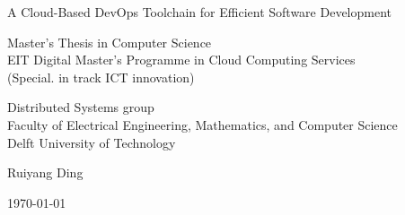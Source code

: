 \begin{titlepage}

  \begin{center}
  \null\vfill
    \begin{center}
    \LARGE{A Cloud-Based DevOps Toolchain for Efficient Software Development}
    \end{center}

    \vspace{3cm}

    \begin{large}
    Master's Thesis in Computer Science\\
    EIT Digital Master’s Programme in Cloud Computing Services \\(Special. in track ICT innovation)
    \end{large}

    \vspace{1.5cm}

    \begin{normalsize}
    Distributed Systems group\\
    Faculty of Electrical Engineering, Mathematics, and Computer Science\\
    Delft University of Technology
    \end{normalsize}

    \vspace{2.0cm}

    \begin{normalsize}
Ruiyang Ding
    \end{normalsize}

    \vspace{1.0cm}

    \today            %

  \vfill
  \end{center}

\end{titlepage}

